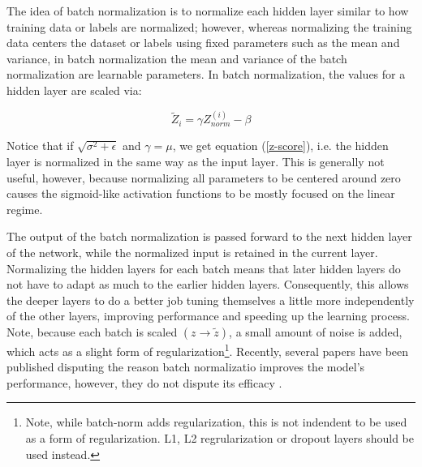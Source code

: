 The idea of batch normalization is to normalize each hidden layer similar to how training data or labels are normalized; however, whereas normalizing the training data centers the dataset or labels using fixed parameters such as the mean and variance, in batch normalization the mean and variance of the batch normalization are learnable parameters. In batch normalization, the values for a hidden layer are scaled via:

\begin{equation}
\widetilde{Z}_i = \gamma Z_{norm}^{(i)} - \beta
\end{equation}

\noindent Notice that if $\sqrt{\sigma^2 + \epsilon}$ and $\gamma = \mu$, we get equation (\ref{z-score}), i.e. the hidden layer is normalized in the same way as the input layer. This is generally not useful, however, because normalizing all parameters to be centered around zero causes the sigmoid-like activation functions to be mostly focused on the linear regime.



The output of the batch normalization is passed forward to the next hidden layer of the network, while the normalized input is retained in the current layer. Normalizing the hidden layers for each batch means that later hidden layers do not have to adapt as much to the earlier hidden layers. Consequently, this allows the deeper layers to do a better job tuning themselves a little more independently of the other layers, improving performance and speeding up the learning process. Note, because each batch is scaled $(z \rightarrow \widetilde{z})$, a small amount of noise is added, which acts as a slight form of regularization\footnote{Note, while batch-norm adds regularization, this is not indendent to be used as a form of regularization. L1, L2 regrularization or dropout layers should be used instead.}. Recently, several papers have been published disputing the reason batch normalizatio improves the model's performance, however, they do not dispute its efficacy \cite{whybatchnorm1} \cite{whybatchnorm2} \cite{whybatchnorm3}. 

